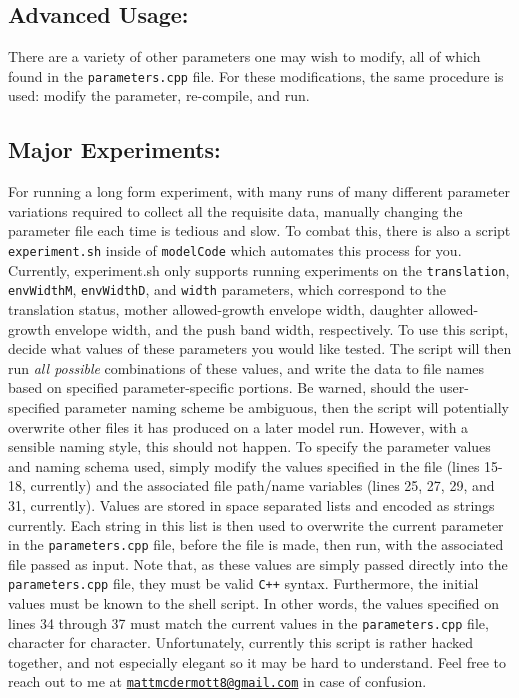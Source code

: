 \documentclass{article}
\begin{document}
  \subsection{Advanced Usage:}
  There are a variety of other parameters one may wish to modify, all of which
  found in the \texttt{parameters.cpp} file. For these modifications, the same
  procedure is used: modify the parameter, re-compile, and run. 
  \subsection{Major Experiments:} 
  For running a long form experiment, with many runs of many different parameter
  variations required to collect all the requisite data, manually changing the
  parameter file each time is tedious and slow. To combat this, there is also a
  script \texttt{experiment.sh} inside of \texttt{modelCode} which automates
  this process for you. Currently, experiment.sh only supports running
  experiments on the \texttt{translation}, \texttt{envWidthM},
  \texttt{envWidthD}, and \texttt{width} parameters, which correspond to the
  translation status, mother allowed-growth envelope width, daughter
  allowed-growth envelope width, and the push band width, respectively. To use
  this script, decide what values of these parameters you would like tested. The
  script will then run \emph{all possible} combinations of these values, and
  write the data to file names based on specified parameter-specific portions.
  Be warned, should the user-specified parameter naming scheme be ambiguous,
  then the script will potentially overwrite other files it has produced on a
  later model run. However, with a sensible naming style, this should not
  happen. To specify the parameter values and naming schema used, simply modify
  the values specified in the file (lines 15-18, currently) and the associated
  file path/name variables (lines 25, 27, 29, and 31, currently). Values are
  stored in space separated lists and encoded as strings currently. Each string
  in this list is then used to overwrite the current parameter in the
  \texttt{parameters.cpp} file, before the file is made, then run, with the
  associated file passed as input. Note that, as these values are simply passed
  directly into the \texttt{parameters.cpp} file, they must be valid
  \texttt{C++} syntax. Furthermore, the initial values must be known to the
  shell script. In other words, the values specified on lines 34 through 37 must
  match the current values in the \texttt{parameters.cpp} file, character for
  character. Unfortunately, currently this script is rather hacked together, and
  not especially elegant so it may be hard to understand. Feel free to reach out
  to me at
  \href{mailto:mattmcdermott8@gmail.com}{\nolinkurl{mattmcdermott8@gmail.com}}
  in case of confusion. 
\end{document}
